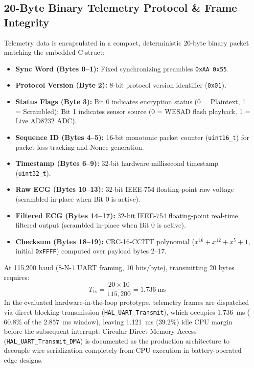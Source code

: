 \documentclass[conference]{IEEEtran}
\begin{document}
\subsection{20-Byte Binary Telemetry Protocol \& Frame Integrity}
Telemetry data is encapsulated in a compact, deterministic 20-byte binary packet matching the embedded C struct:
\begin{itemize}
    \item \textbf{Sync Word (Bytes 0--1):} Fixed synchronizing preambles \texttt{0xAA 0x55}.
    \item \textbf{Protocol Version (Byte 2):} 8-bit protocol version identifier (\texttt{0x01}).
    \item \textbf{Status Flags (Byte 3):} Bit 0 indicates encryption status (0 = Plaintext, 1 = Scrambled); Bit 1 indicates sensor source (0 = WESAD flash playback, 1 = Live AD8232 ADC).
    \item \textbf{Sequence ID (Bytes 4--5):} 16-bit monotonic packet counter (\texttt{uint16\_t}) for packet loss tracking and Nonce generation.
    \item \textbf{Timestamp (Bytes 6--9):} 32-bit hardware millisecond timestamp (\texttt{uint32\_t}).
    \item \textbf{Raw ECG (Bytes 10--13):} 32-bit IEEE-754 floating-point raw voltage (scrambled in-place when Bit 0 is active).
    \item \textbf{Filtered ECG (Bytes 14--17):} 32-bit IEEE-754 floating-point real-time filtered output (scrambled in-place when Bit 0 is active).
    \item \textbf{Checksum (Bytes 18--19):} CRC-16-CCITT polynomial ($x^{16} + x^{12} + x^5 + 1$, initial \texttt{0xFFFF}) computed over payload bytes 2--17.
\end{itemize}

At 115,200 baud (8-N-1 UART framing, 10 bits/byte), transmitting 20 bytes requires:
\begin{equation}
    T_{\text{tx}} = \frac{20 \times 10}{115,200} = 1.736~\text{ms}
\end{equation}
In the evaluated hardware-in-the-loop prototype, telemetry frames are dispatched via direct blocking transmission (\texttt{HAL\_UART\_Transmit}), which occupies 1.736~ms ($60.8\%$ of the $2.857$~ms window), leaving 1.121~ms ($39.2\%$) idle CPU margin before the subsequent interrupt. Circular Direct Memory Access (\texttt{HAL\_UART\_Transmit\_DMA}) is documented as the production architecture to decouple wire serialization completely from CPU execution in battery-operated edge designs.
\end{document}

